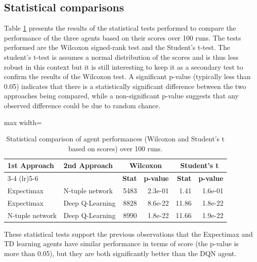\documentclass[letterpaper]{article} %
\begin{document}
    \subsection{Statistical comparisons} \label{sb:statistical_comparisons}
    Table \ref{tab:stat_tests} presents the results of the statistical tests performed to compare the performance of the three agents based on their scores over 100 runs.
    The tests performed are the Wilcoxon signed-rank test and the Student's t-test. 
    The student's t-test is assumes a normal distribution of the scores and is thus less robust in this context but it is still interesting to keep it as a secondary test to confirm the results of the Wilcoxon test.
    A significant p-value (typically less than 0.05) indicates that there is a statistically significant difference between the two approaches being compared, 
    while a non-significant p-value suggests that any observed difference could be due to random chance.
    \begin{table}[H]
        \centering
        \small
        \begin{adjustbox}{max width=\columnwidth}
        \begin{tabular}{l l r r r r}
        \toprule
        \textbf{1st Approach} & \textbf{2nd Approach} 
            & \multicolumn{2}{c}{\textbf{Wilcoxon}} 
            & \multicolumn{2}{c}{\textbf{Student's t}} \\
        \cmidrule(lr){3-4} \cmidrule(lr){5-6}
        & & \textbf{Stat} & \textbf{p-value} & \textbf{Stat} & \textbf{p-value} \\
        \midrule
        Expectimax      & N-tuple network  & 5483 & 2.3e-01 & 1.41  & 1.6e-01 \\
        Expectimax      & Deep Q-Learning  & 8828 & 8.6e-22 & 11.86 & 1.8e-22 \\
        N-tuple network & Deep Q-Learning  & 8990 & 1.8e-22 & 11.66 & 1.9e-22 \\
        \bottomrule
        \end{tabular}
        \end{adjustbox}
        \caption{Statistical comparison of agent performances (Wilcoxon and Student's t based on scores) over 100 runs.}
        \label{tab:stat_tests}
    \end{table}

These statistical tests support the  previous observations that the Expectimax and TD learning agents have similar performance in terms of score (the p-value is more than 0.05), but they are both significantly better than the DQN agent.
\end{document}
